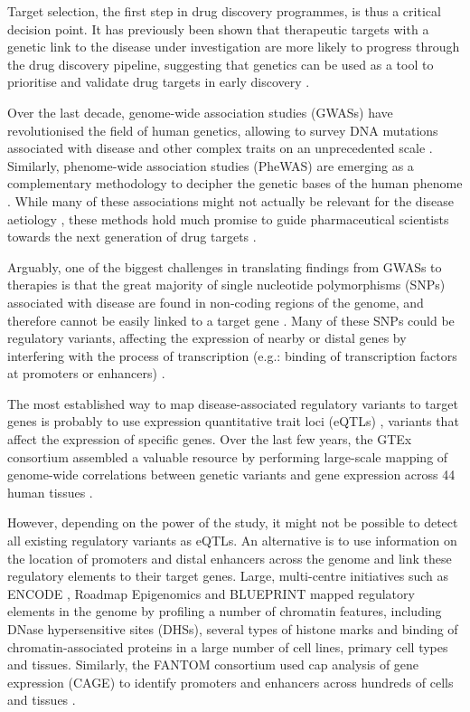\documentclass[9pt,a4paper,]{extarticle}
\begin{document}
Target selection, the first step in drug discovery programmes, is thus a critical decision point.
It has previously been shown that therapeutic targets with a genetic link to the disease under investigation are more likely to progress through the drug discovery pipeline, suggesting that genetics can be used as a tool to prioritise and validate drug targets in early discovery \citep{Plenge2013, Nelson2015}.

Over the last decade, genome-wide association studies (GWASs) have revolutionised the field of human genetics, allowing to survey DNA mutations associated with disease and other complex traits on an unprecedented scale \citep{Visscher2017}.
Similarly, phenome-wide association studies (PheWAS) are emerging as a complementary methodology to decipher the genetic bases of the human phenome \citep{Bush2016}.
While many of these associations might not actually be relevant for the disease aetiology \citep{Boyle2017}, these methods hold much promise to guide pharmaceutical scientists towards the next generation of drug targets \citep{Finan2017}.

Arguably, one of the biggest challenges in translating findings from GWASs to therapies is that the great majority of single nucleotide polymorphisms (SNPs) associated with disease are found in non-coding regions of the genome, and therefore cannot be easily linked to a target gene \citep{Maurano2012}.
Many of these SNPs could be regulatory variants, affecting the expression of nearby or distal genes by interfering with the process of transcription (e.g.: binding of transcription factors at promoters or enhancers) \citep{Ward2012}.

The most established way to map disease-associated regulatory variants to target genes is probably to use expression quantitative trait loci (eQTLs) \citep{Albert2015}, variants that affect the expression of specific genes.
Over the last few years, the GTEx consortium assembled a valuable resource by performing large-scale mapping of genome-wide correlations between genetic variants and gene expression across 44 human tissues \citep{GTEx2017}.

However, depending on the power of the study, it might not be possible to detect all existing regulatory variants as eQTLs.
An alternative is to use information on the location of promoters and distal enhancers across the genome and link these regulatory elements to their target genes.
Large, multi-centre initiatives such as ENCODE \citep{ENCODE2012}, Roadmap Epigenomics \citep{Roadmap2015} and BLUEPRINT \citep{Adams2012, Stunnenberg2016} mapped regulatory elements in the genome by profiling a number of chromatin features, including DNase hypersensitive sites (DHSs), several types of histone marks and binding of chromatin-associated proteins in a large number of cell lines, primary cell types and tissues.
Similarly, the FANTOM consortium used cap analysis of gene expression (CAGE) to identify promoters and enhancers across hundreds of cells and tissues \citep{Fantom2014}.
\end{document}
